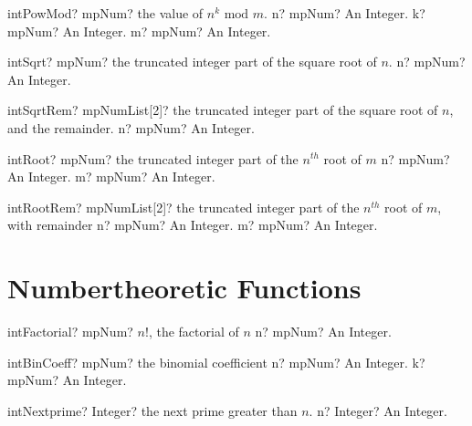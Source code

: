\documentclass[12pt,a4paper,openany]{book}
\begin{document}
\begin{mpFunctionsExtract}
\mpFunctionThree
{intPowMod? mpNum? the value of $n^k \text{ mod } m$.}
{n? mpNum? An Integer.}
{k? mpNum? An Integer.}
{m? mpNum? An Integer.}
\end{mpFunctionsExtract}

\begin{mpFunctionsExtract}
\mpFunctionOne
{intSqrt? mpNum? the truncated integer part of the square root of $n$.}
{n? mpNum? An Integer.}
\end{mpFunctionsExtract}

\begin{mpFunctionsExtract}
\mpFunctionOne
{intSqrtRem? mpNumList[2]? the truncated integer part of the square root of $n$, and the remainder.}
{n? mpNum? An Integer.}
\end{mpFunctionsExtract}

\begin{mpFunctionsExtract}
\mpFunctionTwo
{intRoot? mpNum? the truncated integer part of the $n^{th}$ root of $m$}
{n? mpNum? An Integer.}
{m? mpNum? An Integer.}
\end{mpFunctionsExtract}

\begin{mpFunctionsExtract}
\mpFunctionTwo
{intRootRem? mpNumList[2]? the truncated integer part of the $n^{th}$ root of $m$, with remainder}
{n? mpNum? An Integer.}
{m? mpNum? An Integer.}
\end{mpFunctionsExtract}

\section{Numbertheoretic Functions}

\begin{mpFunctionsExtract}
\mpFunctionOne
{intFactorial? mpNum?  $n!$, the factorial of $n$}
{n? mpNum? An Integer.}
\end{mpFunctionsExtract}

\begin{mpFunctionsExtract}
\mpFunctionTwo
{intBinCoeff? mpNum? the binomial coefficient}
{n? mpNum? An Integer.}
{k? mpNum? An Integer.}
\end{mpFunctionsExtract}

\begin{mpFunctionsExtract}
\mpFunctionOne
{intNextprime? Integer?  the next prime greater than $n$.}
{n? Integer? An Integer.}
\end{mpFunctionsExtract}
\end{document}
